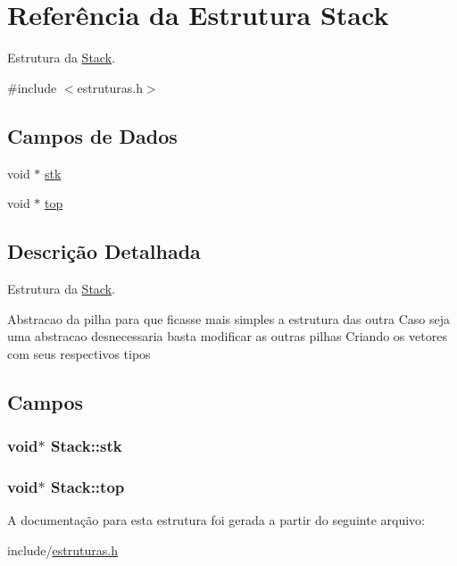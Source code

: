 \hypertarget{struct_stack}{}\section{Referência da Estrutura Stack}
\label{struct_stack}


Estrutura da \hyperlink{struct_stack}{Stack}.  




{\ttfamily \#include $<$estruturas.\+h$>$}

\subsection*{Campos de Dados}
\begin{DoxyCompactItemize}
\item 
void $\ast$ \hyperlink{struct_stack_af2d2e9e2e533f72d25eb18831324dc6b}{stk}
\item 
void $\ast$ \hyperlink{struct_stack_a53d77bffd22d0fa488c483a8f86be67c}{top}
\end{DoxyCompactItemize}


\subsection{Descrição Detalhada}
Estrutura da \hyperlink{struct_stack}{Stack}. 

Abstracao da pilha para que ficasse mais simples a estrutura das outra Caso seja uma abstracao desnecessaria basta modificar as outras pilhas Criando os vetores com seus respectivos tipos 

\subsection{Campos}
\subsubsection[{\texorpdfstring{stk}{stk}}]{\setlength{\rightskip}{0pt plus 5cm}void$\ast$ Stack\+::stk}\hypertarget{struct_stack_af2d2e9e2e533f72d25eb18831324dc6b}{}\label{struct_stack_af2d2e9e2e533f72d25eb18831324dc6b}
\subsubsection[{\texorpdfstring{top}{top}}]{\setlength{\rightskip}{0pt plus 5cm}void$\ast$ Stack\+::top}\hypertarget{struct_stack_a53d77bffd22d0fa488c483a8f86be67c}{}\label{struct_stack_a53d77bffd22d0fa488c483a8f86be67c}


A documentação para esta estrutura foi gerada a partir do seguinte arquivo\+:\begin{DoxyCompactItemize}
\item 
include/\hyperlink{estruturas_8h}{estruturas.\+h}\end{DoxyCompactItemize}
